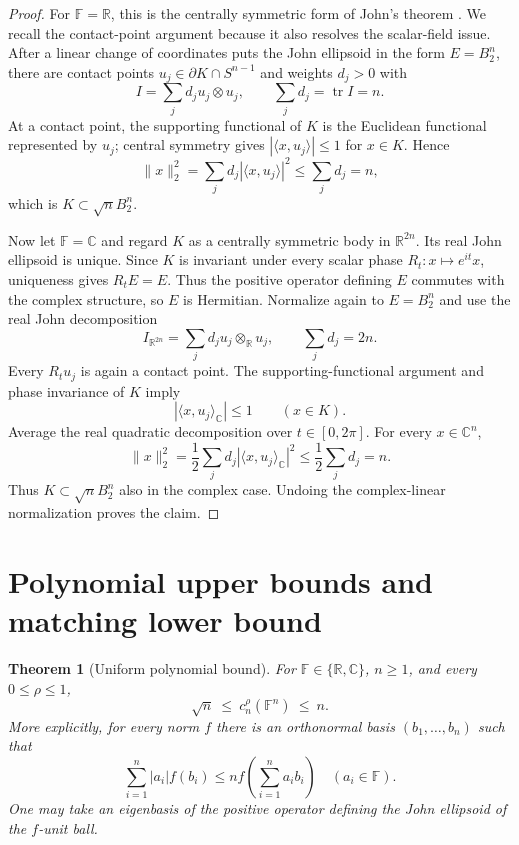 \documentclass[11pt]{article}
\newtheorem{theorem}{Theorem}
\newcommand{\F}{\mathbb F}
\newcommand{\R}{\mathbb R}
\newcommand{\C}{\mathbb C}
\begin{document}
\begin{proof}
For $\F=\R$, this is the centrally symmetric form of John's theorem
\cite{john}.  We recall the contact-point argument because it also resolves
the scalar-field issue.  After a linear change of coordinates puts the John
ellipsoid in the form $E=B_2^n$, there are contact points
$u_j\in\partial K\cap S^{n-1}$ and weights $d_j>0$ with
\[
 I=\sum_j d_j u_j\otimes u_j,
 \qquad \sum_jd_j=\operatorname{tr}I=n.
\]
At a contact point, the supporting functional of $K$ is the Euclidean
functional represented by $u_j$; central symmetry gives
$|\langle x,u_j\rangle|\le1$ for $x\in K$.  Hence
\[
 \|x\|_2^2=\sum_jd_j|\langle x,u_j\rangle|^2
 \le\sum_jd_j=n,
\]
which is $K\subset\sqrt n B_2^n$.

Now let $\F=\C$ and regard $K$ as a centrally symmetric body in
$\R^{2n}$.  Its real John ellipsoid is unique.  Since $K$ is invariant under
every scalar phase $R_t:x\mapsto e^{it}x$, uniqueness gives $R_tE=E$.
Thus the positive operator defining $E$ commutes with the complex structure,
so $E$ is Hermitian.  Normalize again to $E=B_2^n$ and use the real John
decomposition
\[
 I_{\R^{2n}}=\sum_jd_j u_j\otimes_{\R}u_j,
 \qquad \sum_jd_j=2n.
\]
Every $R_tu_j$ is again a contact point.  The supporting-functional argument
and phase invariance of $K$ imply
\[
 |\langle x,u_j\rangle_{\C}|\le1\qquad(x\in K).
\]
Average the real quadratic decomposition over $t\in[0,2\pi]$.  For every
$x\in\C^n$,
\[
 \|x\|_2^2
 =\frac12\sum_jd_j|\langle x,u_j\rangle_{\C}|^2
 \le\frac12\sum_jd_j=n.
\]
Thus $K\subset\sqrt nB_2^n$ also in the complex case.  Undoing the
complex-linear normalization proves the claim.
\end{proof}

\section{Polynomial upper bounds and matching lower bound}

\begin{theorem}[Uniform polynomial bound]\label{thm:main}
For $\F\in\{\R,\C\}$, $n\ge1$, and every $0\le\rho\le1$,
\[
 \boxed{\qquad \sqrt n\ \le\ c_n^\rho(\F^n)\ \le\ n.\qquad}
\]
More explicitly, for every norm $f$ there is an orthonormal basis
$(b_1,\ldots,b_n)$ such that
\[
 \sum_{i=1}^n|a_i|f(b_i)
 \le n f\!\left(\sum_{i=1}^n a_i b_i\right)
 \quad(a_i\in\F).
\]
One may take an eigenbasis of the positive operator defining the John
ellipsoid of the $f$-unit ball.
\end{theorem}
\end{document}
